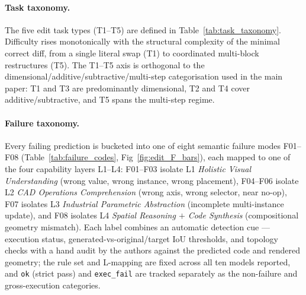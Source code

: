 \paragraph{Task taxonomy.} The five edit task types (T1--T5) are defined in Table~\ref{tab:task_taxonomy}. Difficulty rises monotonically with the structural complexity of the minimal correct diff, from a single literal swap (T1) to coordinated multi-block restructures (T5). The T1--T5 axis is orthogonal to the dimensional/additive/subtractive/multi-step categorisation used in the main paper: T1 and T3 are predominantly dimensional, T2 and T4 cover additive/subtractive, and T5 spans the multi-step regime.




\paragraph{Failure taxonomy.} Every failing prediction is bucketed into one of eight semantic failure modes F01--F08 (Table~\ref{tab:failure_codes}, Fig~\ref{fig:edit_F_bars}), each mapped to one of the four capability layers L1--L4: F01--F03 isolate L1 \emph{Holistic Visual Understanding} (wrong value, wrong instance, wrong placement), F04--F06 isolate L2 \emph{CAD Operations Comprehension} (wrong axis, wrong selector, near no-op), F07 isolates L3 \emph{Industrial Parametric Abstraction} (incomplete multi-instance update), and F08 isolates L4 \emph{Spatial Reasoning $+$ Code Synthesis} (compositional geometry mismatch). Each label combines an automatic detection cue --- execution status, generated-vs-original/target IoU thresholds, and topology checks with a hand audit by the authors against the predicted code and rendered geometry; the rule set and L-mapping are fixed across all ten models reported, and \texttt{ok} (strict pass) and \texttt{exec\_fail} are tracked separately as the non-failure and gross-execution categories.




